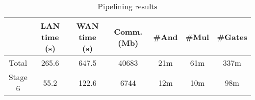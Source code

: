 \begin{table*}
\begin{tabular}{c|c|c|c |c|c|c}
           & LAN time (s) & WAN time (s) & Comm. (Mb)  & \#And & \#Mul & \#Gates \\
\hline
Total      &  265.6       & 647.5        & 40683       & 21m    & 61m    &  337m  \\
\hline
Stage 6    &  55.2        & 122.6        & 6744        & 12m    & 10m   &  98m  \\
\hline
\end{tabular}

 \caption{Pipelining results}
 \label{tab:lcd} 
\end{table*}

